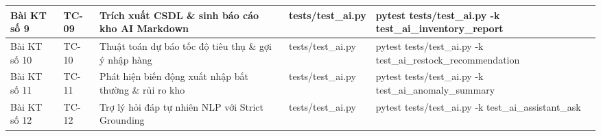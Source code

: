 \begin{table}[h!]
\begin{tabular}{|l|l|l|l|l|}
Bài KT số 9 & TC-09 & Trích xuất CSDL \& sinh báo cáo kho AI Markdown & tests/test\_ai.py & pytest tests/test\_ai.py -k test\_ai\_inventory\_report \\ \hline
Bài KT số 10 & TC-10 & Thuật toán dự báo tốc độ tiêu thụ \& gợi ý nhập hàng & tests/test\_ai.py & pytest tests/test\_ai.py -k test\_ai\_restock\_recommendation \\ \hline
Bài KT số 11 & TC-11 & Phát hiện biến động xuất nhập bất thường \& rủi ro kho & tests/test\_ai.py & pytest tests/test\_ai.py -k test\_ai\_anomaly\_summary \\ \hline
Bài KT số 12 & TC-12 & Trợ lý hỏi đáp tự nhiên NLP với Strict Grounding & tests/test\_ai.py & pytest tests/test\_ai.py -k test\_ai\_assistant\_ask \\ \hline
\end{tabular}
\end{table}

